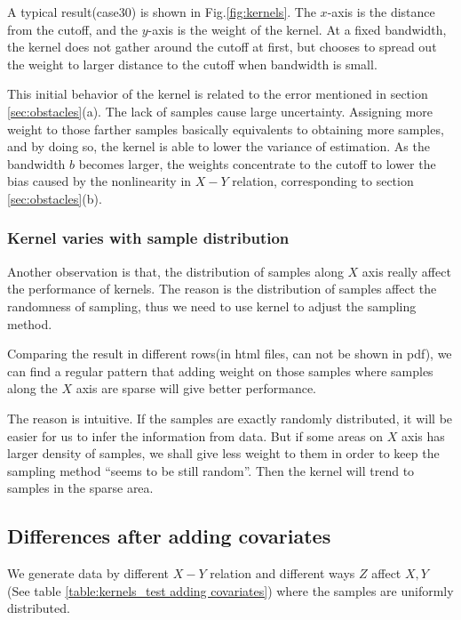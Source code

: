 \documentclass[a4 paper,12pt]{article}
\begin{document}
A typical result(case30) is shown in Fig.\ref{fig:kernels}. The $x$-axis is the distance from the cutoff, and the $y$-axis is the weight of the kernel. At a fixed bandwidth, the kernel does not gather around the cutoff at first, but chooses to spread out the weight to larger distance to the cutoff when bandwidth is small.

This initial behavior of the kernel is related to the error mentioned in section \ref{sec:obstacles}(a). The lack of samples cause large uncertainty. Assigning more weight to those farther samples basically equivalents to obtaining more samples, and by doing so, the kernel is able to lower the variance of estimation. As the bandwidth $b$ becomes larger, the weights concentrate to the cutoff to lower the bias caused by the nonlinearity in $X-Y$ relation, corresponding to section \ref{sec:obstacles}(b).

\subsubsection*{Kernel varies with sample distribution}

Another observation is that, the distribution of samples along $X$ axis really affect the performance of kernels. The reason is the distribution of samples affect the randomness of sampling, thus we need to use kernel to adjust the sampling method.

Comparing the result in different rows(in html files, can not be shown in pdf), we can find a regular pattern that adding weight on those samples where samples along the $X$ axis are sparse will give better performance. 

The reason is intuitive. If the samples are exactly randomly distributed, it will be easier for us to infer the information from data. But if some areas on $X$ axis has larger density of samples, we shall give less weight to them in order to keep the sampling method ``seems to be still random''. Then the kernel will trend to samples in the sparse area.

\subsection{ Differences after adding covariates}
We generate data by different $X-Y$ relation and different ways $Z$ affect $X,Y$ (See table \ref{table:kernels_test adding covariates}) where the samples are uniformly distributed.
\end{document}
